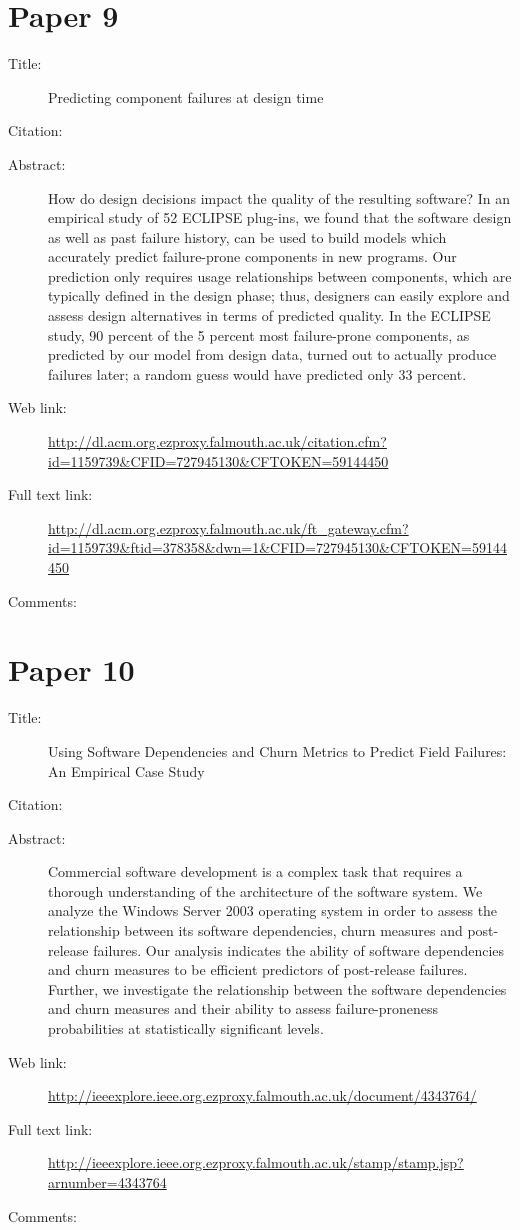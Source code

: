 \documentclass{scrartcl}
\begin{document}
\section*{Paper 9}
\begin{description}
\item[Title:] Predicting component failures at design time
\item[Citation:] \cite{schroter2006predicting}
\item[Abstract:] How do design decisions impact the quality of the resulting software? In an empirical study of 52 ECLIPSE plug-ins, we found that the software design as well as past failure history, can be used to build models which accurately predict failure-prone components in new programs. Our prediction only requires usage relationships between components, which are typically defined in the design phase; thus, designers can easily explore and assess design alternatives in terms of predicted quality. In the ECLIPSE study, 90 percent of the 5 percent most failure-prone components, as predicted by our model from design data, turned out to actually produce failures later; a random guess would have predicted only 33 percent.
\item[Web link:] \url {http://dl.acm.org.ezproxy.falmouth.ac.uk/citation.cfm?id=1159739&CFID=727945130&CFTOKEN=59144450}
\item[Full text link:]\url  {http://dl.acm.org.ezproxy.falmouth.ac.uk/ft_gateway.cfm?id=1159739&ftid=378358&dwn=1&CFID=727945130&CFTOKEN=59144450}
\item[Comments:] 
\end{description}

\section*{Paper 10}
\begin{description}
\item[Title:] Using Software Dependencies and Churn Metrics to Predict Field Failures: An Empirical Case Study
\item[Citation:] \cite{nagappan2007using}
\item[Abstract:] Commercial software development is a complex task that requires a thorough understanding of the architecture of the software system. We analyze the Windows Server 2003 operating system in order to assess the relationship between its software dependencies, churn measures and post-release failures. Our analysis indicates the ability of software dependencies and churn measures to be efficient predictors of post-release failures. Further, we investigate the relationship between the software dependencies and churn measures and their ability to assess failure-proneness probabilities at statistically significant levels.
\item[Web link:]\url  {http://ieeexplore.ieee.org.ezproxy.falmouth.ac.uk/document/4343764/}
\item[Full text link:]\url  {http://ieeexplore.ieee.org.ezproxy.falmouth.ac.uk/stamp/stamp.jsp?arnumber=4343764}
\item[Comments:] 
\end{description}
\end{document}
